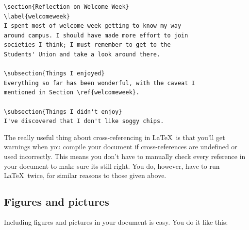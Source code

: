 \begin{refsection}
\begin{verbatim}
\section{Reflection on Welcome Week}
\label{welcomeweek}
I spent most of welcome week getting to know my way
around campus. I should have made more effort to join
societies I think; I must remember to get to the
Students' Union and take a look around there.

\subsection{Things I enjoyed}
Everything so far has been wonderful, with the caveat I 
mentioned in Section \ref{welcomeweek}.

\subsection{Things I didn't enjoy}
I've discovered that I don't like soggy chips.
\end{verbatim}

The really useful thing about cross-referencing in \LaTeX\ is that you'll get warnings when you compile your document if cross-references are undefined or used incorrectly. This means you don't have to manually check every reference in your document to make sure its still right. You do, however, have to run \LaTeX\ twice, for similar reasons to those given above.

\subsection{Figures and pictures}

Including figures and pictures in your document is easy. You do it like this:


\end{refsection}

